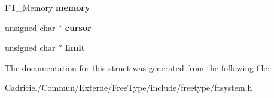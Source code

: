 \begin{DoxyCompactItemize}
\item 
\hypertarget{struct_f_t___stream_rec___a51e2be0d80d70b532aae3face5461e7e}{F\-T\-\_\-\-Memory {\bfseries memory}}\label{struct_f_t___stream_rec___a51e2be0d80d70b532aae3face5461e7e}

\item 
\hypertarget{struct_f_t___stream_rec___ab7dbbad87d8b6d0178771a06e1ce8b4d}{unsigned char $\ast$ {\bfseries cursor}}\label{struct_f_t___stream_rec___ab7dbbad87d8b6d0178771a06e1ce8b4d}

\item 
\hypertarget{struct_f_t___stream_rec___aff006e6ee3bbc2741a2c4ae79b1bad3a}{unsigned char $\ast$ {\bfseries limit}}\label{struct_f_t___stream_rec___aff006e6ee3bbc2741a2c4ae79b1bad3a}

\end{DoxyCompactItemize}


The documentation for this struct was generated from the following file\-:\begin{DoxyCompactItemize}
\item 
Cadriciel/\-Commun/\-Externe/\-Free\-Type/include/freetype/ftsystem.\-h\end{DoxyCompactItemize}
